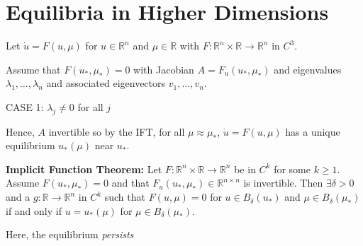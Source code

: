 \documentclass[12pt]{report}
\newcommand{\R}{\mathbb{R}}
\newenvironment{proposition}[1][gray]{
\begin{tcolorbox}[
    parbox=false,
    colback=#1!5!white,
    colframe=#1!75!black,
    breakable
]}
{\end{tcolorbox}}
\begin{document}
\chapter{Equilibria in Higher Dimensions}

Let $\dot u = F(u, \mu)$ for $u \in \R^n$ and $\mu \in \R$ with $F: \R^n \times \R \to \R^n$ in $C^3$.

Assume that $F(u_*, \mu_*) = 0$ with Jacobian $A = F_u(u_*, \mu_*)$ and eigenvalues $\lambda_1, \dots, \lambda_n$ and associated eigenvectors $v_1, \dots, v_n$.

CASE 1: $\lambda_j \neq 0$ for all $j$

Hence, $A$ invertible so by the IFT, for all $\mu \approx \mu_*$, $\dot u = F(u, \mu)$ has a unique equilibrium $u_*(\mu)$ near $u_*$.

\begin{proposition}
    \textbf{Implicit Function Theorem:} Let $F: \R^n \times \R \to \R^n$ be in $C^k$ for some $k \geq 1$. Assume $F(u_*, \mu_*) = 0$ and that $F_u(u_*, \mu_*) \in \R^{n \times n}$ is invertible. Then $\exists \delta >0 $ and a $g: \R \to \R^n$ in $C^k$ such that $F(u, \mu) = 0$ for $u \in B_{\delta}(u_*)$ and $\mu \in B_{\delta}(\mu_*)$ if and only if $u = u_*(\mu)$ for $\mu \in B_{\delta}(\mu_*)$.
\end{proposition}

Here, the equilibrium \emph{persists}

\begin{center}
\end{center}
\end{document}
